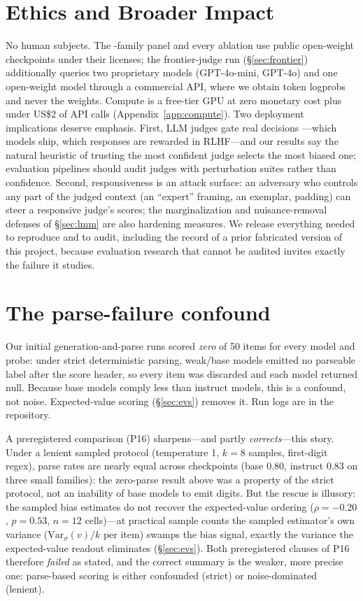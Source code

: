 \documentclass[11pt]{article}
\begin{document}
\section*{Ethics and Broader Impact}
No human subjects. The \NFAM-family panel and every ablation use public open-weight
checkpoints under their licenses; the frontier-judge run (\S\ref{sec:frontier})
additionally queries two proprietary models (GPT-4o-mini, GPT-4o) and one open-weight
model through a commercial API, where we obtain token logprobs and never the weights.
Compute is a free-tier GPU at zero monetary cost plus under US\$2 of API calls
(Appendix~\ref{app:compute}).
Two deployment implications deserve emphasis. First, LLM judges gate real decisions
---which models ship, which responses are rewarded in RLHF---and our results say the
natural heuristic of trusting the most confident judge selects the most biased one;
evaluation pipelines should audit judges with perturbation suites rather than
confidence. Second, responsiveness is an attack surface: an adversary who controls
any part of the judged context (an ``expert'' framing, an exemplar, padding) can
steer a responsive judge's scores; the marginalization and nuisance-removal defenses
of \S\ref{sec:lmm} are also hardening measures. We release everything needed to
reproduce and to audit, including the record of a prior fabricated version of this
project, because evaluation research that cannot be audited invites exactly the
failure it studies.

\appendix
\section{The parse-failure confound}\label{app:parsefail}
Our initial generation-and-parse runs scored \emph{zero} of 50 items for every model
and probe: under strict deterministic parsing, weak/base models emitted no parseable
label after the score header, so every item was discarded and each model returned
null. Because base models comply less than instruct models, this is a confound, not
noise. Expected-value scoring (\S\ref{sec:evs}) removes it. Run logs are in the
repository.

A preregistered comparison (P16) sharpens---and partly \emph{corrects}---this story.
Under a lenient sampled protocol (temperature 1, $k=8$ samples, first-digit regex),
parse rates are nearly equal across checkpoints (base $0.80$, instruct $0.83$ on
three small families): the zero-parse result above was a property of the strict
protocol, not an inability of base models to emit digits. But the rescue is
illusory: the sampled bias estimates do not recover the expected-value ordering
($\rho=-0.20$, $p=0.53$, $n=12$ cells)---at practical sample counts the sampled
estimator's own variance ($\mathrm{Var}_\sigma(v)/k$ per item) swamps the bias
signal, exactly the variance the expected-value readout eliminates
(\S\ref{sec:evs}). Both preregistered clauses of P16 therefore \emph{failed} as
stated, and the correct summary is the weaker, more precise one: parse-based
scoring is either confounded (strict) or noise-dominated (lenient).
\end{document}
